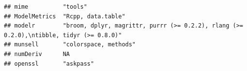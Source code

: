 \documentclass[]{article}
\begin{document}
\begin{verbatim}
## mime          "tools"                                                                                                                                                                                                                                                                                                                                                                                                                                                                               
## ModelMetrics  "Rcpp, data.table"                                                                                                                                                                                                                                                                                                                                                                                                                                                                    
## modelr        "broom, dplyr, magrittr, purrr (>= 0.2.2), rlang (>= 0.2.0),\ntibble, tidyr (>= 0.8.0)"                                                                                                                                                                                                                                                                                                                                                                                               
## munsell       "colorspace, methods"                                                                                                                                                                                                                                                                                                                                                                                                                                                                 
## numDeriv      NA                                                                                                                                                                                                                                                                                                                                                                                                                                                                                    
## openssl       "askpass"                                                                                                                                                                                                                                                                                                                                                                                                                                                                             

\end{verbatim}
\end{document}

